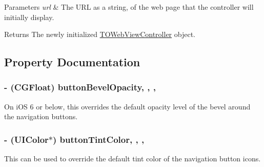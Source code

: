\begin{DoxyParams}{Parameters}
{\em url} & The U\+R\+L as a string, of the web page that the controller will initially display.\\
\hline
\end{DoxyParams}
\begin{DoxyReturn}{Returns}
The newly initialized {\ttfamily \hyperlink{interface_t_o_web_view_controller}{T\+O\+Web\+View\+Controller}} object. 
\end{DoxyReturn}


\subsection{Property Documentation}
\hypertarget{interface_t_o_web_view_controller_a50f0e3cdfdbf352c7d9d46395190208a}{}
\subsubsection[{button\+Bevel\+Opacity}]{\setlength{\rightskip}{0pt plus 5cm}-\/ (C\+G\+Float) button\+Bevel\+Opacity\hspace{0.3cm}{\ttfamily [read]}, {\ttfamily [write]}, {\ttfamily [nonatomic]}, {\ttfamily [assign]}}\label{interface_t_o_web_view_controller_a50f0e3cdfdbf352c7d9d46395190208a}
On i\+O\+S 6 or below, this overrides the default opacity level of the bevel around the navigation buttons. \hypertarget{interface_t_o_web_view_controller_a75c65039f6c1205a568206be6ea25558}{}
\subsubsection[{button\+Tint\+Color}]{\setlength{\rightskip}{0pt plus 5cm}-\/ (U\+I\+Color$\ast$) button\+Tint\+Color\hspace{0.3cm}{\ttfamily [read]}, {\ttfamily [write]}, {\ttfamily [nonatomic]}, {\ttfamily [strong]}}\label{interface_t_o_web_view_controller_a75c65039f6c1205a568206be6ea25558}
This can be used to override the default tint color of the navigation button icons. \hypertarget{interface_t_o_web_view_controller_aeb510e037dde05a88ff6fb0175d26f3f}{}
